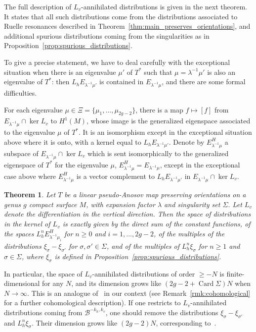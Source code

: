 \documentclass[JEP,XML,SOM,Unicode]{cedram}
\newcommand{\boB}{\mathcal{B}}
\DeclareMathOperator{\Card}{Card}
\newtheorem{thm}{Theorem}[section]
\theoremstyle{definition}
\numberwithin{equation}{section}
\begin{document}
The full description of $L_v$-annihilated distributions is given in the next
theorem. It states that all such distributions come from the distributions
associated to Ruelle resonances described in
Theorem~\ref{thm:main_preserves_orientations}, and additional spurious
distributions coming from the singularities as in
Proposition~\ref{prop:spurious_distributions}.

To give a precise statement, we have to deal carefully with the exceptional
situation when there is an eigenvalue $\mu'$ of $T^*$ such that
$\mu=\lambda^{-1}\mu'$ is also an eigenvalue of $T^*$: then $L_h
E_{\lambda^{-1}\mu'}$ is contained in $E_{\lambda^{-1}\mu}$, and there are
some formal difficulties.

For each eigenvalue $\mu \in \Xi = \{\mu_1,\dotsc, \mu_{2g-2}\}$, there is a
map $f \mapsto [f]$ from $E_{\lambda^{-1}\mu} \cap \ker L_v$ to $H^1(M)$,
whose image is the generalized eigenspace associated to the eigenvalue $\mu$
of $T^*$. It is an isomorphism except in the exceptional situation above
where it is onto, with a kernel equal to $L_h E_{\lambda^{-1}\mu'}$. Denote
by $E_{\lambda^{-1}\mu}^H$ a subspace of $E_{\lambda^{-1}\mu}\cap \ker L_v$
which is sent isomorphically to the generalized eigenspace of $T^*$ for the
eigenvalue $\mu$, \ie $E_{\lambda^{-1}\mu}^H = E_{\lambda^{-1}\mu}$, except
in the exceptional case above where $E_{\lambda^{-1}\mu}^H$ is a vector
complement to $L_h E_{\lambda^{-1}\mu'}$ in $E_{\lambda^{-1}\mu}\cap \ker
L_v$.

\begin{thm}
\label{thm:Lv_invariant_preserves_orientations} Let $T$ be a linear
pseudo-Anosov map preserving orientations on a genus $g$ compact surface $M$,
with expansion factor $\lambda$ and singularity set $\Sigma$. Let $L_v$
denote the differentiation in the vertical direction. Then the space of
distributions in the kernel of $L_v$ is exactly given by the direct sum of
the constant functions, of the spaces $L_h^n E^H_{\lambda^{-1}\mu_i}$ for
$n\geq 0$ and $i=1,\dotsc, 2g-2$, of the multiples of the distributions
$\xi_\sigma - \xi_{\sigma'}$ for $\sigma,\sigma'\in \Sigma$, and of the
multiples of $L_h^n \xi_\sigma$ for $n \geq 1$ and $\sigma \in \Sigma$, where
$\xi_\sigma$ is defined in Proposition~\ref{prop:spurious_distributions}.
\end{thm}

In particular, the space of $L_v$-annihilated distributions of order $\geq
-N$ is finite-dimensional for any $N$, and its dimension grows like $(2g-2 +
\Card \Sigma)N$ when $N\to \infty$. This is an analogue
of~\cite[Th.\,7.7(i)]{forni_deviation} in our context (see
Remark~\ref{rmk:cohomological} for a further cohomological description). If
one restricts to $L_v$-annihilated distributions coming from $\boB^{-k_h,
k_v}$, one should remove the distributions $\xi_\sigma - \xi_{\sigma'}$ and
$L_h^n \xi_\sigma$. Their dimension grows like $(2g-2)N$, corresponding
to~\cite[Th.\,7.7(ii)]{forni_deviation}.
\end{document}
